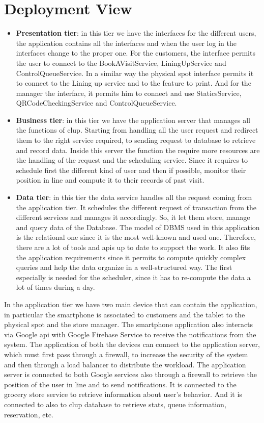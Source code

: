 \section{Deployment View}
\begin{itemize}
    \item \textbf{Presentation tier}: in this tier we have the interfaces for the different users, the application contains all the interfaces and when the user log in the interfaces change to the proper one. For the customers, the interface permits the user to connect to the BookAVisitService, LiningUpService and ControlQueueService. In a similar way the physical spot interface permits it to connect to the Lining up service and to the feature to print. And for the manager the interface, it permits him to connect and use StaticsService, QRCodeCheckingService and ControlQueueService.

    \item \textbf{Business tier}: in this tier we have the application server that manages all the functions of \gls{clup}. Starting from handling all the user request and redirect them to the right service required, to sending request to database to retrieve and record data. Inside this server the function the require more resources are the handling of the request and the scheduling service. Since it requires to schedule first the different kind of user and then if possible, monitor their position in line and compute it to their records of past visit.

    \item \textbf{Data tier}: in this tier the data service handles all the request coming from the application tier. It schedules the different request of transaction from the different services and manages it accordingly. So, it let them store, manage and query data of the Database. The model of DBMS used in this application is the relational one since it is the most well-known and used one. Therefore, there are a lot of tools and \glspl{api} up to date to support the work. It also fits the application requirements since it permits to compute quickly complex queries and help the data organize in a well-structured way. The first especially is needed for the scheduler, since it has to re-compute the data a lot of times during a day.
\end{itemize}
In the application tier we have two main device that can contain the application, in particular the smartphone is associated to customers and the tablet to the physical spot and the store manager. The smartphone application also interacts via Google \gls{api} with Google Firebase Service to receive the notifications from the system. The application of both the devices can connect to the application server, which must first pass through a firewall, to increase the security of the system and then through a load balancer to distribute the workload.
The application server is connected to both Google services also through a firewall to retrieve the position of the user in line and to send notifications. It is connected to the grocery store service to retrieve information about user’s behavior. And it is connected to also to \gls{clup} database to retrieve stats, queue information, reservation, etc.

